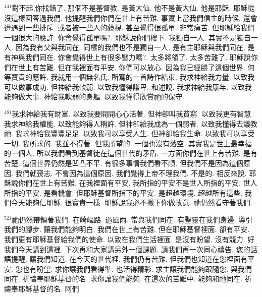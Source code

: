 \documentclass{book}
\begin{document}
$^{441}$對不起,你找錯了.
那個不是基督教.
是黃大仙.
他不是黃大仙.
他是耶穌.
耶穌從沒這樣回答過我們.
他提醒我們你們在世上有苦難.
事實上當我們信主的時候.
還會遭遇到一些排斥.
或者被一些人的藐視.
甚至覺得很孤單.
非常痛苦.
但耶穌給我們一個很大的應許.
你會覺得孤單嗎?.
耶穌說你們樓下.
我獨自一人.
其實不是獨自一人.
因為我有父與我同在.
同樣的我們也不是獨自一人.
是有主耶穌與我們同在.
是有神與我們同在.
你會覺得世上有很多壓力嗎?.
太多將領了.
太多苦難了.
耶穌說你們在世上有苦難.
但在我裡面有平安.
你們可以放心.
因為我已經勝了這個世界.
何等寶貴的應許.
我就用一個無名氏.
所寫的一首詩作結束.
我求神給我力量.
以致我可以做事成功.
但神給我軟弱.
以致我懂得謙卑.
和述說.
我求神給我康年.
以致我能夠做大事.
神給我軟弱的身軀.
以致我懂得欣賞祂的保守.

$^{481}$我求神給我有財富.
以致我要開開心心活著.
但神卻叫我貧窮.
以致我更有智慧.
我求神給我權能.
以致能夠得人稱許.
但神卻給我成為一個弱者.
以致我懂得去議教祂.
我求神給我豐豐足足.
以致我可以享受人生.
但神卻給我生命.
以致我可以享受一切.
我所求的.
我並不得著.
但我所望的.
一個也沒有落空.
其實我是世上最幸福的一個人.
所以我們看到基督徒在這個世代的矛盾.
一方面你們在世上有苦難.
是有苦楚.
這個世界仍然是凹凸不平.
有很多事情我們看不順.
但我們不是因為這個原因.
我們就喪志.
不會因為這個原因.
我們覺得上帝不理我們.
不是的.
相反來說.
耶穌說你們在世上有苦難.
在我裡面有平安.
我所指的平安不是世人所指的平安.
世人所指的平安.
是看機會.
但耶穌基督所指下的平安.
是超越環境.
超越所有這些.
我們今天能夠信耶穌.
很寶貴一樣.
耶穌說我必不撇下你做故意.
祂仍然看守著我們.

$^{521}$祂仍然帶領著我們.
在崎嶇路.
過風雨.
常與我們同在.
有聖靈在我們身邊.
導引我們的腳步.
讓我們能夠明白.
我們在世上有苦難.
但在耶穌基督裡面.
卻有平安.
我們更有耶穌基督給我們的使命.
以致在我們生活裡面.
是沒有盼望.
沒有競力.
好我們今天講到這裡.
下次再和大家講另外一個課題.
請我們再一次同心禱告.
您的話語提醒.
讓我們知道.
在今天的世代裡.
我們仍有苦難.
但我們也知道在您裡面有平安.
您也有盼望.
求你讓我們看得準.
也活得精彩.
求主讓我們能夠跟隨您.
與我們同在.
祈禱奉耶穌基督的名.
求你讓我們能夠.
在這次的苦難中.
能夠和祂同在.
祈禱奉耶穌基督的名.
阿們.
\newpage
\end{document}

